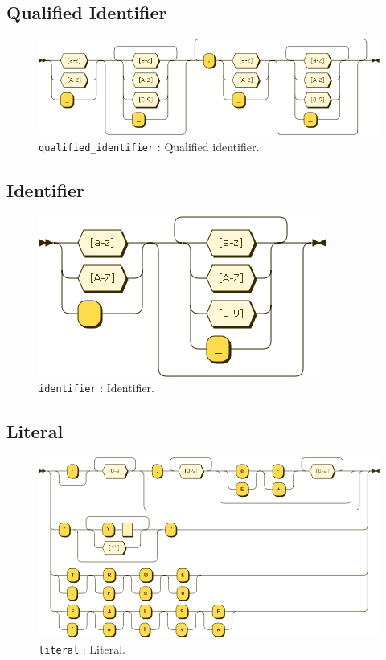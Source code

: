 \subsection{Qualified Identifier}
\begin{figure}[!h]
  \centering
    \includegraphics[scale=\DiagramScale,angle=90]{chapters/compiler/diagrams/qualified_identifier}
  \caption{\texttt{qualified\_identifier} : Qualified identifier.}
  \label{fig:pcl-qualified-id}
\end{figure}

\subsection{Identifier}
\begin{figure}[!h]
  \centering
    \includegraphics[scale=\DiagramScale]{chapters/compiler/diagrams/identifier}
  \caption{\texttt{identifier} : Identifier.}
  \label{fig:pcl-id}
\end{figure}

\subsection{Literal}
\begin{figure}[!h]
  \centering
    \includegraphics[scale=\DiagramScale,angle=90]{chapters/compiler/diagrams/literal}
  \caption{\texttt{literal} : Literal.}
  \label{fig:pcl-literal}
\end{figure}